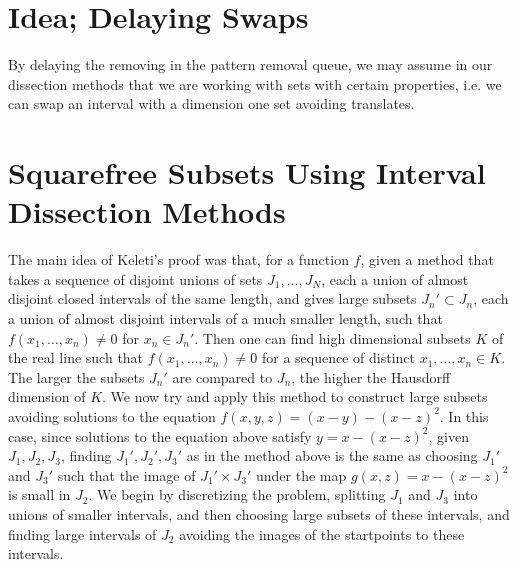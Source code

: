 \documentclass{report}
\theoremstyle{plain}
\theoremstyle{plain}
\begin{document}
\section{Idea; Delaying Swaps}

By delaying the removing in the pattern removal queue, we may assume in our dissection methods that we are working with sets with certain properties, i.e. we can swap an interval with a dimension one set avoiding translates.

\section{Squarefree Subsets Using Interval Dissection Methods}

The main idea of Keleti's proof was that, for a function $f$, given a method that takes a sequence of disjoint unions of sets $J_1, \dots, J_N$, each a union of almost disjoint closed intervals of the same length, and gives large subsets $J_n' \subset J_n$, each a union of almost disjoint intervals of a much smaller length, such that $f(x_1, \dots, x_n) \neq 0$ for $x_n \in J_n'$. Then one can find high dimensional subsets $K$ of the real line such that $f(x_1, \dots, x_n) \neq 0$ for a sequence of distinct $x_1, \dots, x_n \in K$. The larger the subsets $J_n'$ are compared to $J_n$, the higher the Hausdorff dimension of $K$. We now try and apply this method to construct large subsets avoiding solutions to the equation $f(x,y,z) = (x - y) - (x - z)^2$. In this case, since solutions to the equation above satisfy $y = x - (x-z)^2$, given $J_1, J_2, J_3$, finding $J_1', J_2', J_3'$ as in the method above is the same as choosing $J_1'$ and $J_3'$ such that the image of $J_1' \times J_3'$ under the map $g(x,z) = x - (x-z)^2$ is small in $J_2$. We begin by discretizing the problem, splitting $J_1$ and $J_3$ into unions of smaller intervals, and then choosing large subsets of these intervals, and finding large intervals of $J_2$ avoiding the images of the startpoints to these intervals.
\end{document}
